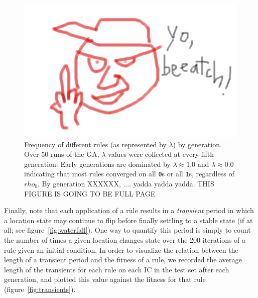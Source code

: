 \begin{figure} [p!]
\begin{center}
\includegraphics[width=7in]{foo.png}
\caption{Frequency of different rules (as represented by $\lambda$) by generation. Over 50 runs of the GA, $\lambda$ values were collected at every 
fifth generation. Early generations are dominated by $\lambda \approx 1.0$ and $\lambda \approx 0.0$ indicating that most rules converged on all 
\texttt{0}s or all \texttt{1}s, regardless of $rho_0$. By generation XXXXXX, .... yadda yadda yadda. THIS FIGURE IS GOING TO BE FULL PAGE}
\label{fig:histogram}
\end{center}
\end{figure}

Finally, note that each application of a rule results in a \textit{transient} period in which a location state may continue to flip before finally settling to a 
stable state (if at all; see figure~\ref{fig:waterfall}). One way to quantify this period is simply to count the number of times a given location changes state 
over the 200 iterations of a rule given an initial condition. In order to visualize the relation between the length of a transient period and the fitness of a rule, 
we recorded the average length of the transients for each rule on each IC in the test set after each generation, and plotted this value against the fitness 
for that rule (figure~\ref{fig:transients}).

